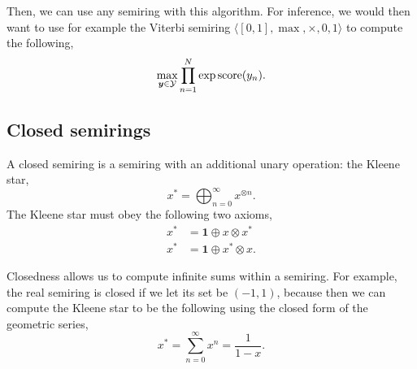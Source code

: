 Then, we can use any semiring with this algorithm. For inference, we would then
want to use for example the Viterbi semiring $\langle [0,1], \max, \times, 0, 1
\rangle$ to compute the following, \[
  \max_{\bm{y}\in\mathcal{Y}} \prod_{n=1}^N \exp \mathrm{score}(y_n)
.\]

\subsection{Closed semirings}

\begin{definition}
  A closed semiring is a semiring with an additional unary operation: the
  Kleene star, \[
    x^* = \bigoplus_{n=0}^\infty x^{\otimes n}
  .\]
  The Kleene star must obey the following two axioms,
  \begin{align*}
    x^* &= \bm{1} \oplus x \otimes x^* \\
    x^* &= \bm{1} \oplus x^* \otimes x
  .\end{align*}
\end{definition}

Closedness allows us to compute infinite sums within a semiring. For example,
the real semiring is closed if we let its set be $(-1,1)$, because then we can
compute the Kleene star to be the following using the closed form of the
geometric series, \[
  x^* = \sum_{n=0}^\infty x^n = \frac{1}{1-x}
.\]

